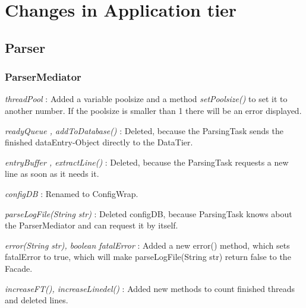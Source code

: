 \section{Changes in Application tier}

\subsection{Parser}


\subsubsection{ParserMediator}

\textit{threadPool} : Added a variable poolsize and a method \textit{setPoolsize()} to set it to another number. 
If the poolsize is smaller than 1 there will be an error displayed. \newline\newline

\textit{readyQueue , addToDatabase()} : Deleted, because the ParsingTask sends the finished dataEntry-Object directly to the DataTier.
\newline\newline

\textit{entryBuffer , extractLine()} : Deleted, because the ParsingTask requests a new line as soon as it needs it.\newline\newline

\textit{configDB} : Renamed to ConfigWrap.\newline\newline

\textit{parseLogFile(String str)} : Deleted configDB, because ParsingTask knows about the ParserMediator and can request it by itself.
\newline\newline

\textit{error(String str), boolean fatalError} : Added a new error() method, which sets fatalError to true, which will 
make parseLogFile(String str) return false to the Facade.\newline\newline

\textit{increaseFT(), increaseLinedel()} : Added new methods to count finished threads and deleted lines. \newline\newline

